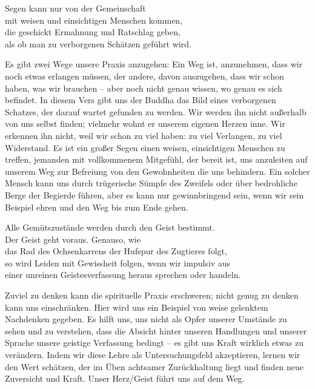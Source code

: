 
\begin{dhpVerse}{76}
\label{dhp-76}
Segen kann nur von der Gemeinschaft\\ 
mit weisen und einsichtigen Menschen kommen,\\ 
die geschickt Ermahnung und Ratschlag geben,\\ 
als ob man zu verborgenen Schätzen geführt wird. 
\end{dhpVerse}

\begin{dhpRefl}

Es gibt zwei Wege unsere Praxis anzugehen: Ein Weg ist, anzunehmen, dass wir
noch etwas erlangen müssen, der andere, davon auszugehen, dass wir schon
haben, was wir brauchen -- aber noch nicht genau wissen, wo genau es sich
befindet. In diesem Vers gibt uns der Buddha das Bild eines verborgenen
Schatzes, der darauf wartet gefunden zu werden. Wir werden ihn nicht außerhalb
von uns selbst finden; vielmehr wohnt er unserem eigenen Herzen inne. Wir
erkennen ihn nicht, weil wir schon zu viel haben: zu viel Verlangen, zu viel
Widerstand. Es ist ein großer Segen einen weisen, einsichtigen Menschen zu
treffen, jemanden mit vollkommenem Mitgefühl, der bereit ist, uns anzuleiten
auf unserem Weg zur Befreiung von den Gewohnheiten die uns behindern. Ein
solcher Mensch kann uns durch trügerische Sümpfe des Zweifels oder über
bedrohliche Berge der Begierde führen, aber es kann nur gewinnbringend sein,
wenn wir sein Beispiel ehren und den Weg bis zum Ende gehen.

\end{dhpRefl}


\begin{dhpVerse}{1}
\label{dhp-1}
Alle Gemütszustände werden durch den Geist bestimmt.\\ 
Der Geist geht voraus. Genauso, wie\\ 
das Rad des Ochsenkarrens der Hufspur des Zugtieres folgt,\\ 
so wird Leiden mit Gewissheit folgen, wenn wir impulsiv aus\\ 
einer unreinen Geistesverfassung heraus sprechen oder handeln. 
\end{dhpVerse}

\begin{dhpRefl}

Zuviel zu denken kann die spirituelle Praxis erschweren; nicht genug zu denken
kann uns einschränken. Hier wird uns ein Beispiel von weise gelenktem
Nachdenken gegeben. Es hilft uns, uns nicht als Opfer unserer Umstände zu
sehen und zu verstehen, dass die Absicht hinter unseren Handlungen und unserer
Sprache unsere geistige Verfassung bedingt -- es gibt uns Kraft wirklich etwas
zu verändern. Indem wir diese Lehre als Untersuchungsfeld akzeptieren, lernen
wir den Wert schätzen, der im Üben achtsamer Zurückhaltung liegt und finden
neue Zuversicht und Kraft. Unser Herz/Geist führt uns auf dem Weg.

\end{dhpRefl}

